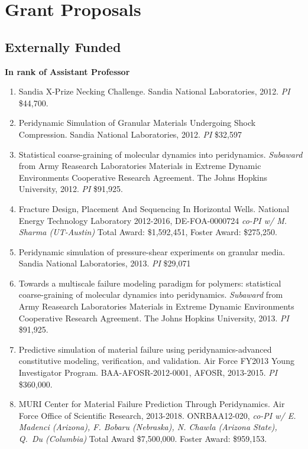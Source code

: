\section*{Grant Proposals}

\subsection*{Externally Funded}%

\ifdefined\iscockrell
    \pagebreak[2]
    \textbf{In rank of Assistant Professor}
\begin{enumerate}
  \item Sandia X-Prize Necking Challenge.  Sandia National Laboratories, 2012. \textit{PI} \$44,700.
  \item Peridynamic Simulation of Granular Materials Undergoing Shock Compression.  Sandia National Laboratories, 2012. \textit{PI} \$32,597
  \item Statistical coarse-graining of molecular dynamics into peridynamics. \textit{Subaward} from Army Reasearch Laboratories Materials in Extreme Dynamic Environments Cooperative Research Agreement.  The Johns Hopkins University, 2012. \textit{PI} \$91,925.
  \item Fracture Design, Placement And Sequencing In Horizontal Wells. National Energy Technology Laboratory 2012-2016, DE-FOA-0000724 \textit{co-PI w/ M. Sharma (UT-Austin)} Total Award: {\$1,592,451}, Foster Award: \$275,250.
  \item Peridynamic simulation of pressure-shear experiments on granular media.  Sandia National Laboratories, 2013. \textit{PI} \$29,071
  \item Towards a multiscale failure modeling paradigm for polymers: statistical coarse-graining of molecular dynamics into peridynamics. \textit{Subaward} from Army Reasearch Laboratories Materials in Extreme Dynamic Environments Cooperative Research Agreement.  The Johns Hopkins University, 2013. \textit{PI} \$91,925.
  \item Predictive simulation of material failure using peridynamics-advanced constitutive modeling, verification, and validation. Air Force FY2013 Young Investigator Program. BAA-AFOSR-2012-0001, AFOSR, 2013-2015. \textit{PI} \$360,000.
  \item MURI Center for Material Failure Prediction Through Peridynamics. Air Force Office of Scientific Research, 2013-2018. ONRBAA12-020, \textit{co-PI w/ E. Madenci (Arizona), F. Bobaru (Nebraska), N. Chawla (Arizona State), Q.\ Du (Columbia)} Total Award {\$}7,500,000.  Foster Award: \$959,153.

\end{enumerate}
